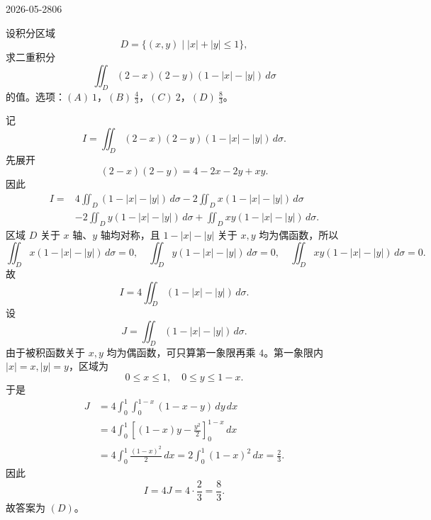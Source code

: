 \begin{mistake}{2026-05-28}{06}

\begin{problemcontent}
设积分区域
\[
D=\{(x,y)\mid |x|+|y|\le 1\},
\]
求二重积分
\[
\iint_D (2-x)(2-y)(1-|x|-|y|)\,d\sigma
\]
的值。选项：\((A)\ 1\)，\((B)\ \frac{4}{3}\)，\((C)\ 2\)，\((D)\ \frac{8}{3}\)。
\end{problemcontent}

\begin{solutioncontent}
记
\[
I=\iint_D (2-x)(2-y)(1-|x|-|y|)\,d\sigma .
\]
先展开
\[
(2-x)(2-y)=4-2x-2y+xy.
\]
因此
\[
\begin{aligned}
I={}&4\iint_D(1-|x|-|y|)\,d\sigma
-2\iint_Dx(1-|x|-|y|)\,d\sigma \\
&-2\iint_Dy(1-|x|-|y|)\,d\sigma
+\iint_Dxy(1-|x|-|y|)\,d\sigma .
\end{aligned}
\]
区域 \(D\) 关于 \(x\) 轴、\(y\) 轴均对称，且 \(1-|x|-|y|\) 关于 \(x,y\) 均为偶函数，所以
\[
\iint_Dx(1-|x|-|y|)\,d\sigma=0,
\quad
\iint_Dy(1-|x|-|y|)\,d\sigma=0,
\quad
\iint_Dxy(1-|x|-|y|)\,d\sigma=0.
\]
故
\[
I=4\iint_D(1-|x|-|y|)\,d\sigma.
\]
设
\[
J=\iint_D(1-|x|-|y|)\,d\sigma.
\]
由于被积函数关于 \(x,y\) 均为偶函数，可只算第一象限再乘 \(4\)。第一象限内 \(|x|=x, |y|=y\)，区域为
\[
0\le x\le 1,\quad 0\le y\le 1-x.
\]
于是
\[
\begin{aligned}
J&=4\int_0^1\int_0^{1-x}(1-x-y)\,dy\,dx \\
&=4\int_0^1\left[(1-x)y-\frac{y^2}{2}\right]_0^{1-x}\,dx \\
&=4\int_0^1\frac{(1-x)^2}{2}\,dx
=2\int_0^1(1-x)^2\,dx
=\frac{2}{3}.
\end{aligned}
\]
因此
\[
I=4J=4\cdot\frac{2}{3}=\frac{8}{3}.
\]
故答案为 \((D)\)。
\end{solutioncontent}


\end{mistake}
